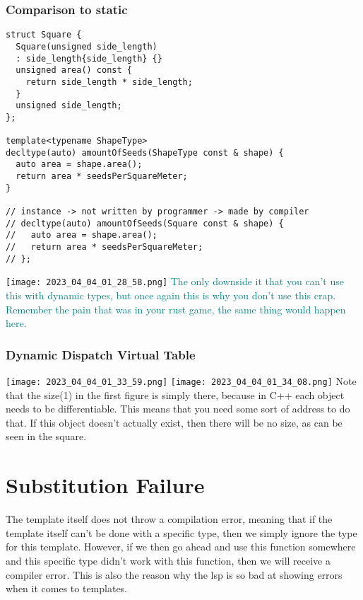\documentclass[main.tex,fontsize=8pt,paper=a4,paper=portrait,DIV=calc,]{scrartcl}
\begin{document}
\subsubsection{Comparison to static}
\begin{lstlisting}
struct Square {
  Square(unsigned side_length)
  : side_length{side_length} {}
  unsigned area() const {
    return side_length * side_length;
  }
  unsigned side_length;
};

template<typename ShapeType>
decltype(auto) amountOfSeeds(ShapeType const & shape) {
  auto area = shape.area();
  return area * seedsPerSquareMeter;
}

// instance -> not written by programmer -> made by compiler
// decltype(auto) amountOfSeeds(Square const & shape) {
//   auto area = shape.area();
//   return area * seedsPerSquareMeter;
// };
\end{lstlisting}
\texttt{[image: 2023\_04\_04\_01\_28\_58.png]}\newline
\textcolor{teal}{The only downside it that you can't use this with dynamic types, but once again this is why you don't use this crap.
Remember the pain that was in your rust game, the same thing would happen here.}

\subsubsection{Dynamic Dispatch Virtual Table}
\texttt{[image: 2023\_04\_04\_01\_33\_59.png]}
\texttt{[image: 2023\_04\_04\_01\_34\_08.png]}\newline
Note that the size(1) in the first figure is simply there, because in C++ each object needs to be differentiable.\newline
This means that you need some sort of address to do that. If this object doesn't actually exist, then there will be no size, as can be seen in the square.

\section{Substitution Failure}
The template itself does not throw a compilation error, meaning that if the template itself can't be done with a specific type, then we simply ignore the type for this template.
However, if we then go ahead and use this function somewhere and this specific type didn't work with this function, then we will receive a compiler error.
This is also the reason why the lsp is so bad at showing errors when it comes to templates.
\end{document}
